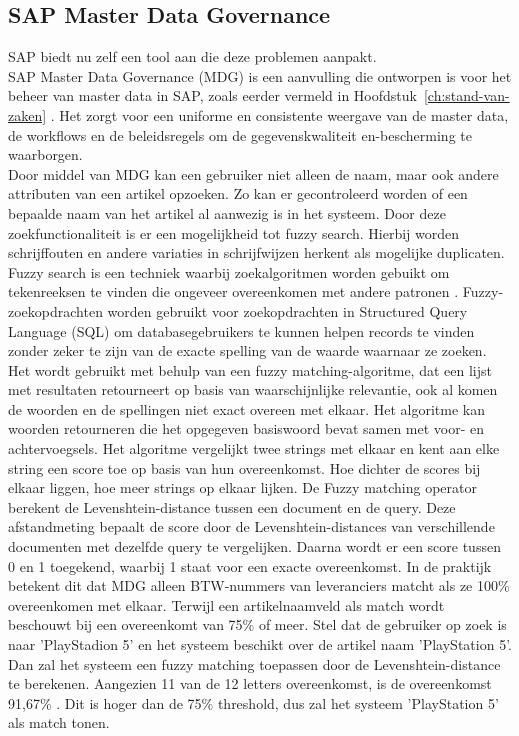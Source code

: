 \subsection{SAP Master Data Governance}
SAP biedt nu zelf een tool aan die deze problemen aanpakt. 
\\SAP Master Data Governance (MDG) is een aanvulling die ontworpen is voor het beheer van master data in SAP, zoals eerder vermeld in Hoofdstuk~\ref{ch:stand-van-zaken} \autocite{SAPMDG}. Het zorgt voor een uniforme en consistente weergave van de master data, de workflows en de beleidsregels om de gegevenskwaliteit en-bescherming te waarborgen. 
\\Door middel van MDG kan een gebruiker niet alleen de naam, maar ook andere attributen van een artikel opzoeken. Zo kan er gecontroleerd worden of een bepaalde naam van het artikel al aanwezig is in het systeem. Door deze zoekfunctionaliteit is er een mogelijkheid tot fuzzy search. Hierbij worden schrijffouten en andere variaties in schrijfwijzen herkent als mogelijke duplicaten. 
\\Fuzzy search is een techniek waarbij zoekalgoritmen worden gebuikt om tekenreeksen te vinden die ongeveer overeenkomen met andere patronen \autocite{TechTarget2022}. Fuzzy-zoekopdrachten worden gebruikt voor zoekopdrachten in Structured Query Language (SQL) om databasegebruikers te kunnen helpen records te vinden zonder zeker te zijn van de exacte spelling van de waarde waarnaar ze zoeken. Het wordt gebruikt met behulp van een fuzzy matching-algoritme, dat een lijst met resultaten retourneert op basis van waarschijnlijke relevantie, ook al komen de woorden en de spellingen niet exact overeen met elkaar. Het algoritme kan woorden retourneren die het opgegeven basiswoord bevat samen met voor- en achtervoegsels. Het algoritme vergelijkt twee strings met elkaar en kent aan elke string een score toe op basis van hun overeenkomst. Hoe dichter de scores bij elkaar liggen, hoe meer strings op elkaar lijken. De Fuzzy matching operator berekent de Levenshtein-distance tussen een document en de query. Deze afstandmeting bepaalt de score door de Levenshtein-distances van verschillende documenten met dezelfde query te vergelijken. Daarna wordt er een score tussen 0 en 1 toegekend, waarbij 1 staat voor een exacte overeenkomst. In de praktijk betekent dit dat MDG alleen BTW-nummers van leveranciers matcht als ze 100\% overeenkomen met elkaar. Terwijl een artikelnaamveld als match wordt beschouwt bij een overeenkomt van 75\% of meer. Stel dat de gebruiker op zoek is naar 'PlayStadion 5' en het systeem beschikt over de artikel naam 'PlayStation 5'. Dan zal het systeem een fuzzy matching toepassen door de Levenshtein-distance te berekenen. Aangezien 11 van de 12 letters overeenkomst, is de overeenkomst 91,67\% \autocite{IBM}. Dit is hoger dan de 75\% threshold, dus zal het systeem 'PlayStation 5' als match tonen.
